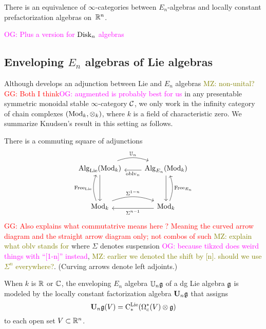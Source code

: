 \documentclass[11pt]{amsart}
\numberwithin{equation}{section}
\def\owen{\textcolor{magenta}{OG: }\textcolor{magenta}}
\def\mahmoud{\textcolor{olive}{MZ: }\textcolor{olive}}
\def\greg{\textcolor{red}{GG: }\textcolor{red}}
\begin{document}
\begin{thm}
\label{T:En=Fac} 
There is an equivalence of $\infty$-categories between $E_n$-algebras and locally constant prefactorization algebras on~$\mathbb R^n$. 
\end{thm}

\owen{Plus a version for ${\rm Disk}_n$ algebras}

\subsection{Enveloping $E_n$ algebras of Lie algebras}
\label{sec: enveloping}

Although \cite{Knudsen} develops an adjunction between Lie and $E_n$ algebras \mahmoud{non-unital?}\greg{Both I think}\owen{augmented is probably best for us}
in any presentable symmetric monoidal stable $\infty$-category $\mathcal C$,
we only work in the infinity category of chain complexes $({\rm Mod}_k, \otimes_k)$, where $k$ is a field of characteristic zero.
We summarize Knudsen's result in this setting as follows.

\begin{thm}\label{T:UnofLie}
There is a commuting square of adjunctions
\[
\begin{tikzcd}
\Alg_\Lie(\Mod_k) \arrow[r, bend left=20, shift left=.5ex,"\UU_n"] \arrow[dd] & \Alg_{E_n}(\Mod_k) \arrow[l, shift left=.5ex, "\oblv_n"] \arrow[dd]\\
&\\
\Mod_k \arrow[r, bend left=20, shift left=.5ex, "\Sigma^{1-n}"] \arrow[uu, bend left=20, shift left=.5ex, "\Free_\Lie"] & \Mod_k \arrow[l, shift left=.5ex,"\Sigma^{n-1}"] \arrow[uu, bend right=20, shift right=.5ex, "\Free_{E_n}"']
\end{tikzcd}
\]
\greg{Also explains what commutatrive means here ? Meaning the curved arrow diagram and the straight arrow diagram only; not combos of such}
\mahmoud{explain what oblv stands for}
where $\Sigma$ denotes suspension \owen{because tikzcd does weird things with ``[1-n]'' instead}, \mahmoud{earlier we denoted the shift by [n]. should we use $\Sigma^n$ everywhere?}.
(Curving arrows denote left adjoints.)

When $k$ is $\mathbb R$ or $\mathbb C$, 
the enveloping $E_n$ algebra $\mathbb U_n \mathfrak g$ of a dg Lie algebra $\mathfrak g$ is modeled by the locally constant factorization algebra $\mathbf U_n \mathfrak g$ that assigns
\[
\mathbf U_n \mathfrak g(V) = {\rm C}^{\rm Lie}_*(\Omega^*_c(V) \otimes \mathfrak g)
\]
to each open set $V \subset \mathbb R^n$.
\end{thm}
\end{document}
